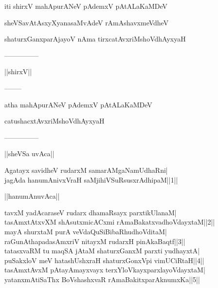 \documentclass{article}
\begin{document}
\begin{center}
iti shirxV mahApurANeV pAdemxV pAtALaKaMDeV
\end{center}

\begin{center}
sheVSavAtAsxyXyanasaMvAdeV rAmAshavxmeVdheV
\end{center}

\begin{center}
shaturxGanxparAjayoV nAma tirxcatAvxriMshoVdhAyxyaH
\end{center}

\begin{center}
---------------
\end{center}

\begin{center}
||shirxV||
\end{center}

\begin{center}
--------
\end{center}

\begin{center}
atha mahApurANeV pAdemxV pAtALaKaMDeV
\end{center}

\begin{center}
catushacxtAvxriMshoVdhAyxyaH
\end{center}

\begin{center}
---------------
\end{center}

\begin{center}
||sheVSa uvAca||
\end{center}

Agatayx savidheV rudarxM samarAMgaNamUdhaRni|\\
jagAda hanumAnivxVraH saMjihiVSuRsusxrAdhipaM||1||\\

\begin{center}
||hanumAnuvAca||
\end{center}

tavxM yadAcaraseV rudarx dhamaRsayx parxtikUlanaM|\\
tasAmxtAtxvXM shAsutxmicACxmi rAmaBakatxvadhoVdayxtaM||2||\\
mayA shurxtaM purA veVdaQuSiBibaRhudhoVditaM|\\
raGunAthapadasAmxriV nitayxM rudarxH pinAkaBaqtf||3||\\
tatasxvaRM tu maqSA jAtaM shaturxGanxM parxti yudhayxtA|\\
puSakxloV meV hatashUshxraH shaturxGonxVpi vimUCiRtaH||4||\\
tasAmxtAvxM pAtayAmayxvayx terxYloVkayxparxlayoVdayxtaM|\\
yatanxmAtiSaThx BoVshashxvaR rAmaBakitxparAknumxKa||5||\\
\end{document}
